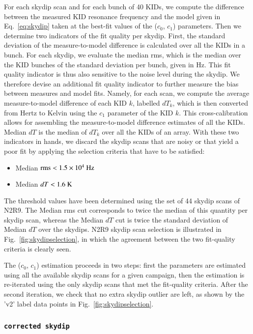 For each skydip scan and for each bunch of 40 KIDs, we compute the
difference between the measured KID resonance frequency and the model
given in Eq.~\ref{eq:skydip} taken at the best-fit values of the
($c_0$, $c_1$) parameters. Then we determine two indicators of the fit
quality per skydip. First, the standard deviation of the
measure-to-model difference is calculated over all the KIDs in a
bunch. For each skydip, we evaluate the median rms, which is the
median over the KID bunches of the standard deviation per bunch, given
in Hz. This fit quality indicator is thus also sensitive to the noise
level during the skydip. We therefore devise an additional fit quality
indicator to further measure the bias between measures and model fits.
Namely, for each scan, we compute the average
measure-to-model difference of each KID $k$, labelled $dT_k$, which is
then converted from Hertz to Kelvin using the $c_1$ parameter of the
KID $k$. This cross-calibration allows for assembling the
measure-to-model difference estimates of all the KIDs.
Median $dT$ is the median of $dT_k$ over all the KIDs of an
array. With these two indicators in hands, we discard the skydip scans
that are noisy or that yield a poor fit by applying the selection
criteria that have to be satisfied:

\begin{itemize}
\item Median $\rm{rms} < 1.5 \times 10^{4}~\rm{Hz}$
\item Median $dT < 1.6~\rm{K}$
\end{itemize}

The threshold values have been determined using the set of 44 skydip
scans of N2R9. The Median rms cut corresponds to twice the median of
this quantity per skydip scan, whereas the Median $dT$ cut is twice
the standard deviation of Median $dT$ over the skydips.
N2R9 skydip scan selection is illustrated in
Fig.~\ref{fig:skydipselection}, in
which the agreement between the two fit-quality criteria is clearly
seen.

The ($c_0$, $c_1$) estimation proceeds in two steps: first the
parameters are estimated using all the available skydip scans for a
given campaign, then the estimation is re-iterated using the only
skydip scans that met the fit-quality criteria. After the second
iteration, we check that no extra skydip outlier are left, as shown by
the 'v2' label data points in Fig.~\ref{fig:skydipselection}.





\subsubsection{{\tt corrected skydip}}
\label{se:corrected-skydip}

